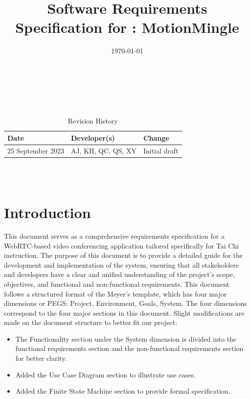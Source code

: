 \documentclass[12pt]{article}
\begin{document}
\title{Software Requirements Specification for \progname: MotionMingle} 
\author{\authname}
\date{\today}
	
\maketitle

~\newpage


\tableofcontents

~\newpage

\begin{table}[hp]
  \caption{Revision History} \label{TblRevisionHistory}
  \begin{tabularx}{\textwidth}{llX}
    \toprule
    \textbf{Date} & \textbf{Developer(s)} & \textbf{Change}\\
    \midrule
    25 September 2023 & AJ, KH, QC, QS, XY & Initial draft \\
    \bottomrule
  \end{tabularx}
\end{table}

~\\

~\newpage
\section{Introduction}
This document serves as a comprehensive requirements specification for a WebRTC-based video conferencing application tailored specifically for Tai Chi instruction. The purpose of this document is to provide a detailed guide for the development and implementation of the system, ensuring that all stakeholders and developers have a clear and unified understanding of the project’s scope, objectives, and functional and non-functional requirements. This document follows a structured format of the Meyer’s template, which has four major dimensions or PEGS: Project, Environment, Goals, System. The four dimensions correspond to the four major sections in this document. Slight modifications are made on the document structure to better fit our project:
\begin{itemize}
  \item The Functionality section under the System dimension is divided into the functional requirements section and the non-functional requirements section for better clarity.
  \item Added the Use Case Diagram section to illustrate use cases.
  \item Added the Finite State Machine section to provide formal specification.
\end{itemize}
\end{document}
